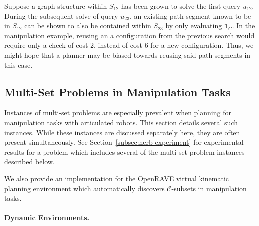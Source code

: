 Suppose a graph structure within ${S_{12}}$ has been grown to solve
the first query $u_{12}$.
During the subsequent solve of query $u_{23}$,
an existing path segment known to be in ${S_{12}}$ can be shown to
also be contained within ${S_{23}}$ by only evaluating $\mathbf{1}_C$.
In the manipulation example,
reusing an a configuration from the previous search
would require only a check of cost 2,
instead of cost 6 for a new configuration.
Thus, we might hope that a planner may be biased towards reusing
said path segments in this case.

\subsection{Multi-Set Problems in Manipulation Tasks}
\label{sec:in-manipulation}

Instances of multi-set problems are especially prevalent when
planning for manipulation tasks with articulated robots.
This section details several such instances.
While these instances are discussed separately here,
they are often present simultaneously.
See Section~\ref{subsec:herb-experiment}
for experimental results for a problem
which includes several of the multi-set problem instances
described below.

We also provide an implementation for the
OpenRAVE \citep{diankov2010openrave}
virtual kinematic planning environment
which automatically discovers $\mathcal{C}$-subsets
in manipulation tasks.

\vspace{0.1in}
\noindent
\paragraph{Dynamic Environments.}
\label{subsec:dynamic-environments}

